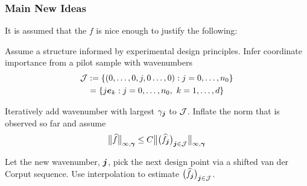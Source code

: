 \documentclass[11pt,compress,xcolor={usenames,dvipsnames},aspectratio=169]{beamer}
\begin{document}
\begin{frame}
\frametitle{Main New Ideas}
\vspace{-5ex}
It is assumed that the $f$ is nice enough to justify the following:
\begin{description}[labelwidth = 30ex]
	\item[Inferring $\vgamma$] Assume a structure informed by  experimental design principles.  Infer coordinate importance from a pilot sample with wavenumbers 
	\begin{align*}
	\cj &:= \{(0, \ldots, 0,j ,0 \ldots, 0) : j = 0, \ldots, n_0\} \\
	&  = \{ j \ve_k :  j = 0, \ldots, n_0, \ k=1, \ldots, d\}
	\end{align*}
	
	\item[Inferring {$\bignorm[\infty,\vgamma]{\hf}$}]  Iteratively add wavenumber with largest $\gamma_{\vj}$ to $\cj$. Inflate the norm that  is observed so far and assume
	\[
	\bignorm[\infty,\vgamma]{\hf} \le C \bignorm[\infty,\vgamma]{\bigl(\hf_{\vj}\bigr)_{\vj \in \cj}}
	\]
	
	\item[Function values]  Let the new wavenumber, $\vj$, pick the next design point via a shifted van der Corput sequence.  Use interpolation to estimate $\bigl(\hf_{\vj}\bigr)_{\vj \in \cj}$.

\end{description}
\end{frame}

\end{document}
